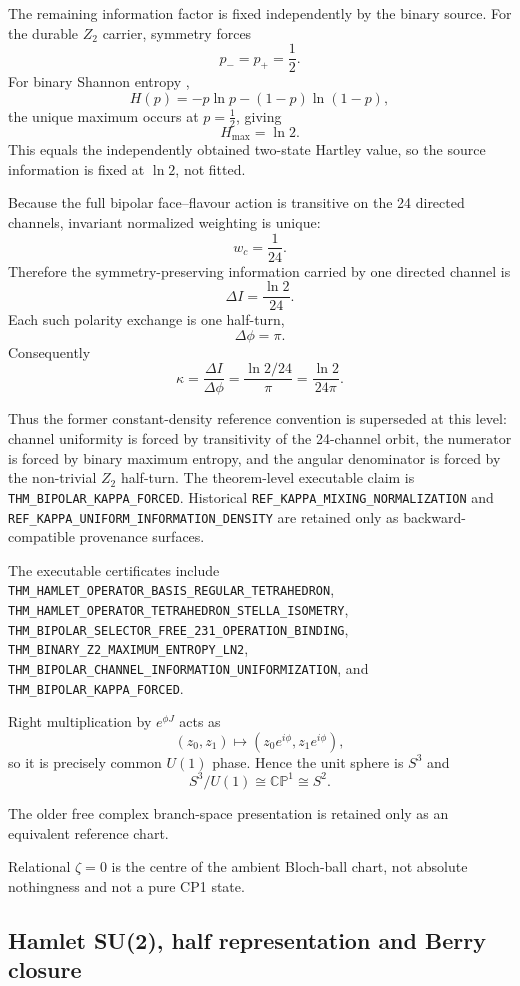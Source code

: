 \documentclass[11pt]{article}
\newcommand{\claimid}[1]{\nolinkurl{#1}}
\begin{document}
The remaining information factor is fixed independently by the binary source.
For the durable \(Z_2\) carrier, symmetry forces
\[
p_-=p_+=\frac12.
\]
For binary Shannon entropy \cite{Shannon1948},
\[
H(p)
=
-p\ln p-(1-p)\ln(1-p),
\]
the unique maximum occurs at \(p=\tfrac12\), giving
\[
\boxed{
H_{\max}=\ln2.
}
\]
This equals the independently obtained two-state Hartley value, so the source
information is fixed at \(\ln2\), not fitted.

Because the full bipolar face--flavour action is transitive on the 24 directed
channels, invariant normalized weighting is unique:
\[
\boxed{
w_c=\frac1{24}.
}
\]
Therefore the symmetry-preserving information carried by one directed channel
is
\[
\boxed{
\Delta I
=
\frac{\ln2}{24}.
}
\]
Each such polarity exchange is one half-turn,
\[
\boxed{
\Delta\phi=\pi.
}
\]
Consequently
\[
\boxed{
\kappa
=
\frac{\Delta I}{\Delta\phi}
=
\frac{\ln2/24}{\pi}
=
\frac{\ln2}{24\pi}.
}
\]

Thus the former constant-density reference convention is superseded at this
level: channel uniformity is forced by transitivity of the 24-channel orbit,
the numerator is forced by binary maximum entropy, and the angular denominator
is forced by the non-trivial \(Z_2\) half-turn. The theorem-level executable
claim is \claimid{THM_BIPOLAR_KAPPA_FORCED}. Historical
\claimid{REF_KAPPA_MIXING_NORMALIZATION} and
\claimid{REF_KAPPA_UNIFORM_INFORMATION_DENSITY} are retained only as
backward-compatible provenance surfaces.

The executable certificates include
\claimid{THM_HAMLET_OPERATOR_BASIS_REGULAR_TETRAHEDRON},
\claimid{THM_HAMLET_OPERATOR_TETRAHEDRON_STELLA_ISOMETRY},
\claimid{THM_BIPOLAR_SELECTOR_FREE_231_OPERATION_BINDING},
\claimid{THM_BINARY_Z2_MAXIMUM_ENTROPY_LN2},
\claimid{THM_BIPOLAR_CHANNEL_INFORMATION_UNIFORMIZATION}, and
\claimid{THM_BIPOLAR_KAPPA_FORCED}.

Right multiplication by \(e^{\phi J}\) acts as
\[
(z_0,z_1)
\mapsto
(z_0e^{i\phi},z_1e^{i\phi}),
\]
so it is precisely common \(U(1)\) phase. Hence the unit sphere is \(S^3\)
and
\[
\boxed{
S^3/U(1)
\cong
\mathbb{CP}^1
\cong
S^2.
}
\]

The older free complex branch-space presentation is retained only as an
equivalent reference chart.

Relational \(\zeta=0\) is the centre of the ambient Bloch-ball chart, not
absolute nothingness and not a pure CP1 state.

\subsection{Hamlet SU(2), half representation and Berry closure}
\end{document}
